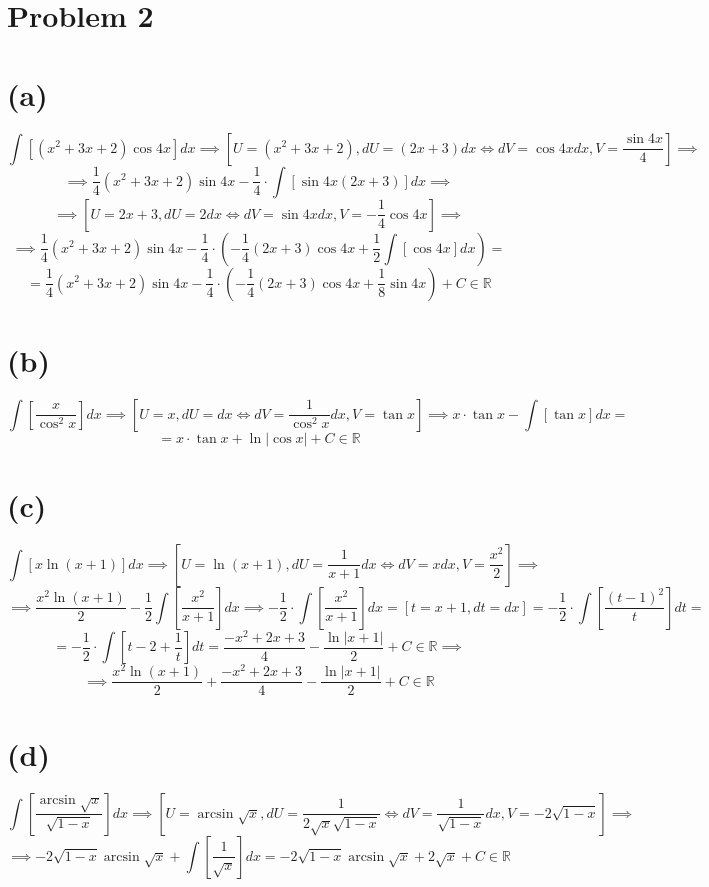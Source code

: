 \documentclass{article}
\begin{document}
\section*{Problem 2}
\section*{(a)}
$$\int\left[(x^2 + 3x + 2)\cos{4x}\right]dx\implies[U = (x^2 + 3x + 2), dU = (2x + 3)dx\iff dV = \cos{4x}dx, V = \frac{\sin{4x}}{4}]\implies$$
$$\implies\frac{1}{4}(x^2 + 3x + 2)\sin{4x} - \frac{1}{4}\cdot\int\left[\sin{4x}(2x + 3)\right]dx\implies$$
$$\implies[U = 2x + 3, dU = 2dx\iff dV = \sin{4x}dx, V = -\frac{1}{4}\cos{4x}]\implies$$
$$\implies\frac{1}{4}(x^2 + 3x + 2)\sin{4x} - \frac{1}{4}\cdot\left(-\frac{1}{4}(2x + 3)\cos{4x} + \frac{1}{2}\int\left[\cos{4x}\right]dx\right) = $$
$$=\frac{1}{4}(x^2 + 3x + 2)\sin{4x} - \frac{1}{4}\cdot\left(-\frac{1}{4}(2x + 3)\cos{4x} + \frac{1}{8}\sin{4x}\right) + C\in\mathbb{R}$$
\section*{(b)}
$$\int\left[\frac{x}{\cos^2{x}}\right]dx\implies [U = x, dU = dx\iff dV = \frac{1}{\cos^2{x}}dx, V = \tan{x}]\implies x\cdot\tan{x} - \int\left[\tan{x}\right]dx = $$
$$ = x\cdot\tan{x} + \ln{|\cos{x}|} + C\in\mathbb{R}$$ %
\section*{(c)}
$$\int\left[x\ln{(x + 1)}\right]dx\implies [U = \ln{(x + 1)}, dU = \frac{1}{x + 1}dx\iff dV = xdx, V = \frac{x^2}{2}]\implies$$
$$\implies\frac{x^2\ln{(x + 1)}}{2} - \frac{1}{2}\int\left[\frac{x^2}{x + 1}\right]dx\implies -\frac{1}{2}\cdot\int\left[\frac{x^2}{x + 1}\right]dx = [t = x + 1, dt = dx] = -\frac{1}{2}\cdot\int\left[\frac{(t - 1)^2}{t}\right]dt = $$
$$ = -\frac{1}{2}\cdot\int\left[t - 2 + \frac{1}{t}\right]dt = \frac{-x^2 + 2x + 3}{4} - \frac{\ln{|x + 1|}}{2} + C\in\mathbb{R}\implies$$
$$\implies \frac{x^2\ln{(x + 1)}}{2} + \frac{-x^2 + 2x + 3}{4} - \frac{\ln{|x + 1|}}{2} + C\in\mathbb{R}$$
\section*{(d)}
$$\int\left[\frac{\arcsin{\sqrt{x}}}{\sqrt{1 - x}}\right]dx\implies[U = \arcsin{\sqrt{x}}, dU = \frac{1}{2\sqrt{x}\sqrt{1 - x}}\iff dV = \frac{1}{\sqrt{1 - x}}dx, V = -2\sqrt{1 - x}]\implies$$
$$\implies-2\sqrt{1 - x}\arcsin{\sqrt{x}} + \int\left[\frac{1}{\sqrt{x}}\right]dx = -2\sqrt{1 - x}\arcsin{\sqrt{x}} + 2\sqrt{x} + C\in\mathbb{R}$$
\end{document}
